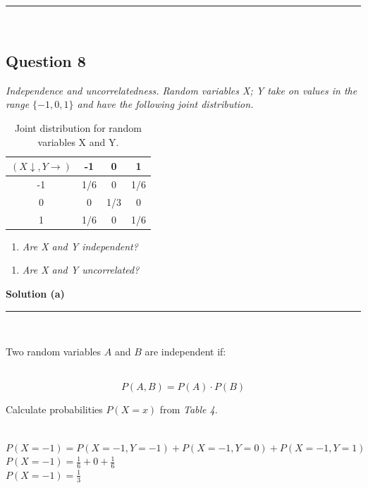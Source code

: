 \documentclass{article}
\begin{document}
\noindent\rule{\textwidth}{0.4pt}\\

\newpage

\subsection*{Question 8}
\textit{Independence and uncorrelatedness. Random variables X; Y take on values in the range $\{-1,0,1\}$ and have the following joint distribution.}\\

\begin{table}[h]
\centering
\begin{tabular}{c|ccc}
$(X\downarrow ,Y \rightarrow)$ & -1 & 0 & 1 \\ \hline
-1 & 1/6 & 0 & 1/6 \\
0 & 0 & 1/3 & 0 \\
1 & 1/6 & 0 & 1/6 \\
\end{tabular}
\caption{Joint distribution for random variables X and Y.}
\label{tab:example_fractions}
\end{table}

\begin{enumerate}[label=(a)]
  \item \textit{Are X and Y independent?}
\end{enumerate}

\begin{enumerate}[label=(b)]
  \item \textit{Are X and Y uncorrelated?}
\end{enumerate}

\textbf{Solution (a)}

\noindent\rule{\textwidth}{0.4pt}\\

\parbox{\textwidth}{Two random variables $A$ and $B$ are independent if:}\\

$$P(A, B) = P(A) \cdot P(B)$$


\parbox{\textwidth}{Calculate probabilities $P(X = x)$ from \textit{Table 4}.}\\

$P(X = -1) = P(X = -1, Y = -1) + P(X = -1, Y = 0) + P(X = -1, Y = 1)$\\

$P(X = -1) = \frac{1}{6} + 0 + \frac{1}{6}$ \\

$P(X = -1)= \frac{1}{3}$\\
\end{document}

